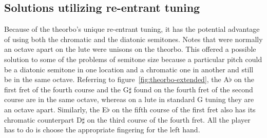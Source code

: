 \subsection{Solutions utilizing re-entrant tuning}

Because of the theorbo's unique re-entrant tuning, it has the potential advantage of using
both the chromatic and the diatonic semitones.  Notes that were normally an octave
apart on the lute were unisons on the theorbo.  This offered a possible solution to some
of the problems of semitone size because a particular pitch could be a diatonic semitone
in one location and a chromatic one in another and still be in the same octave. Referring
to figure~\ref{fig:theorbo-extended}, the A$\flat$ on the first fret of the fourth course
and the G$\sharp$ found on the fourth fret of the second course are in the same octave,
whereas on a lute in standard G tuning they are an octave apart. Similarly, the E$\flat$
on the fifth course of the first fret also has its chromatic counterpart D$\sharp$ on the
third course of the fourth fret.  All the player has to do is choose the appropriate
fingering for the left hand.

